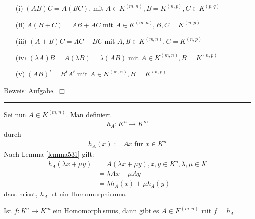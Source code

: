 \documentclass[11pt]{report}
\begin{document}
\begin{lemma}
\label{lemma531}
\begin{itemize}
 \item[(i)] $(AB)C = A(BC)$, mit $A \in K^{(m,n)}, B = K^{(n,p)}, C \in K^{(p,q)}$
 \item[(ii)] $A(B+C) = AB + AC$ mit $A \in K^{(m,n)}, B, C = K^{(n,p)}$
 \item[(iii)] $(A+B)C = AC + BC$ mit $A, B \in K^{(m,n)}, C = K^{(n,p)}$
 \item[(iv)] $(\lambda A)B = A(\lambda B) = \lambda (AB)$ mit $A \in K^{(m,n)}, B = K^{(n,p)}$
 \item[(v)]  $(AB)^t = B^t A^t$ mit $A \in K^{(m,n)}, B = K^{(n,p)}$ 
\end{itemize}
\end{lemma}
\vspace*{0.3cm}Beweis: Aufgabe. \hspace*{1cm} \hfill $\Box$
\vspace*{0.2cm}\rule{\linewidth}{0.3mm}\vspace{0.2cm}
Sei nun $A \in K^{(m,n)}$. Man definiert
\begin{align}
 h_A: K^n \rightarrow K^m
\end{align}
durch
\begin{align}
 h_A(x) := Ax \text{ für } x \in K^n
\end{align}
Nach Lemma \ref{lemma531} gilt:
\begin{align}
 h_A (\lambda x + \mu y) &= A(\lambda x + \mu y), x, y \in K^n, \lambda, \mu \in K\\
&= \lambda A x + \mu A y  \\
&= \lambda h_A (x) + \mu h_A(y)
\end{align}
dass heisst, $h_A$ ist ein Homomorphismus.

\begin{satz}
\label{satz532}
Ist $f: K^n \rightarrow K^m$ ein Homomorphismus, dann gibt es $A \in K^{(m,n)}$ mit $f = h_A$
\end{satz}
\end{document}
